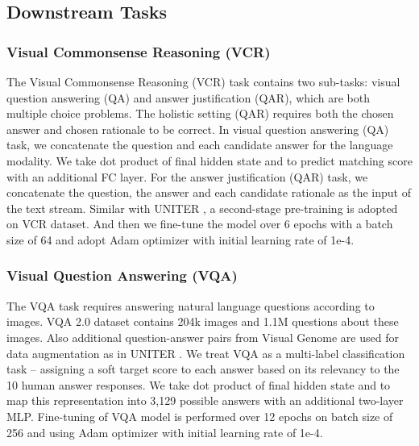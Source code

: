 \documentclass[letterpaper]{article} \usepackage{aaai21}  \usepackage{times}  \usepackage{helvet} \usepackage{courier}  \usepackage[hyphens]{url}  \usepackage{graphicx} \urlstyle{rm} \def\UrlFont{\rm}  \usepackage{natbib}  \usepackage{caption} \frenchspacing  \setlength{\pdfpagewidth}{8.5in}  \setlength{\pdfpageheight}{11in}  \usepackage{cite}
\begin{document}
\subsection{Downstream Tasks}
\subsubsection{Visual Commonsense Reasoning (VCR)}

The Visual Commonsense Reasoning (VCR) \cite{zellers2019recognition} task contains two sub-tasks: visual question answering (QA) and answer justification (QAR), which are  both multiple choice problems. The holistic setting (QAR) requires both the chosen answer and chosen rationale to be correct. In visual question answering (QA) task, we concatenate the question and each candidate answer for the language modality.  We take dot product of final hidden state    and  to predict matching score with an additional FC layer. For the answer justification (QAR) task, we concatenate the question, the answer and each candidate rationale as the input of the text stream. Similar with UNITER \cite{chen2019uniter}, a second-stage pre-training is adopted on VCR dataset. And then we fine-tune the model over 6 epochs with a batch size of 64 and adopt Adam optimizer with initial learning rate of 1e-4.

\subsubsection{Visual Question Answering (VQA)}


The VQA task requires answering natural language questions according to images. VQA 2.0 dataset \cite{antol2015vqa} contains  204k images and 1.1M questions about these images. Also additional question-answer pairs from Visual Genome are used for data augmentation as in UNITER \cite{chen2019uniter}.
We treat VQA as a multi-label classification task – assigning a soft target score to each answer based on its relevancy to the 10 human answer responses. We take dot product of final hidden state    and  to map this representation into 3,129 possible answers with an additional two-layer MLP.  Fine-tuning of VQA model is performed over 12 epochs on batch size of 256 and using Adam optimizer with initial learning rate of 1e-4. 
\end{document}
